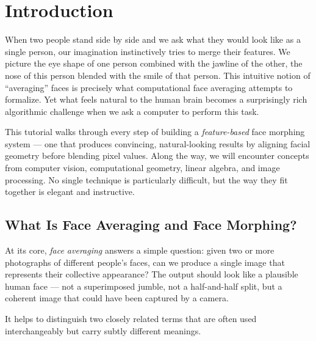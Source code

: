 \section{Introduction}

When two people stand side by side and we ask what they would look like as a single person, our
imagination instinctively tries to merge their features. We picture the eye shape of one person
combined with the jawline of the other, the nose of this person blended with the smile of that
person. This intuitive notion of ``averaging'' faces is precisely what computational face
averaging attempts to formalize. Yet what feels natural to the human brain becomes a surprisingly
rich algorithmic challenge when we ask a computer to perform this task.

This tutorial walks through every step of building a \emph{feature-based} face morphing system ---
one that produces convincing, natural-looking results by aligning facial geometry before blending
pixel values. Along the way, we will encounter concepts from computer vision, computational
geometry, linear algebra, and image processing. No single technique is particularly difficult, but
the way they fit together is elegant and instructive.


\subsection{What Is Face Averaging and Face Morphing?}

At its core, \emph{face averaging} answers a simple question: given two or more photographs of
different people's faces, can we produce a single image that represents their collective
appearance? The output should look like a plausible human face --- not a superimposed jumble, not
a half-and-half split, but a coherent image that could have been captured by a camera.

It helps to distinguish two closely related terms that are often used interchangeably but carry
subtly different meanings.

